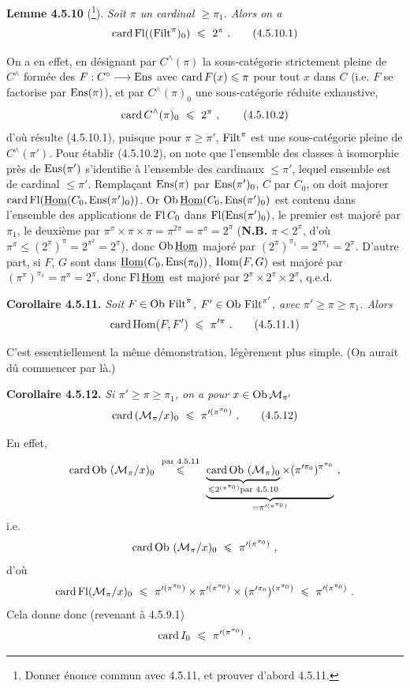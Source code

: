 \textbf{Lemme 4.5.10} (\footnote{Donner énonce commun avec 4.5.11, et prouver d'abord 4.5.11.}). \textit{Soit $\pi$ un cardinal $\geqslant \pi_1$. Alors on a} %
\[
\card \Fl((\Filt^\pi)_0) \ \leqslant \ 2^\pi \ . \tag*{(4.5.10.1)}
\]

On a en effet, en désignant par $C^\wedge(\pi)$ la sous-catégorie strictement pleine de $C^\wedge$ formée des $F : C^\circ \longrightarrow \mathrm{Ens}$ avec $\operatorname{card} F(x) \leqslant \pi$ pour tout $x$ dans $C$ (i.e. $F$ se factorise par $\mathrm{Ens}(\pi)$), et par $C^\wedge(\pi)_0$ une
sous-catégorie réduite exhaustive,
\[
\operatorname{card} C^\wedge(\pi)_0 \ \leqslant \ 2^\pi \ , \tag*{(4.5.10.2)}
\]
d'où résulte (4.5.10.1), puisque pour $\pi \geqslant \pi'$, $\operatorname{Filt}^\pi$ est une sous-catégorie pleine de $C^\wedge(\pi')$. Pour établir (4.5.10.2), on note que l'ensemble des classes à isomorphie près de $\mathrm{Ens}(\pi')$ s'identifie à l'ensemble des cardinaux $\leqslant \pi'$, lequel ensemble est de cardinal $\leqslant \pi'$. Remplaçant $\mathrm{Ens}(\pi)$ par $\mathrm{Ens}(\pi')_0$, $C$ par $C_0$, on doit majorer $\operatorname{card} \operatorname{Fl}(\underline{\mathrm{Hom}}(C_0, \mathrm{Ens}(\pi')_0))$. Or $\mathrm{Ob}\, \underline{\mathrm{Hom}}(C_0, \mathrm{Ens}(\pi')_0)$ est contenu dans l'ensemble des applications de $\operatorname{Fl} C_0$ dans $\operatorname{Fl}(\mathrm{Ens}(\pi')_0)$, le premier est majoré par $\pi_1$, le deuxième par $\pi^\pi \times \pi \times \pi = \pi^{2\pi} = \pi^\pi = 2^\pi$ (\textbf{N.B.} $\pi < 2^\pi$, d'où $\pi^\pi \leqslant (2^\pi)^\pi = 2^{\pi^2} = 2^\pi$), donc $\mathrm{Ob}\, \underline{\mathrm{Hom}}$ majoré par $(2^\pi)^{\pi_1} = 2^{\pi\pi_1} = 2^\pi$. D'autre part, si $F$, $G$ sont dans $\underline{\mathrm{Hom}}(C_0, \mathrm{Ens}(\pi_0))$, $\mathrm{Hom}(F,G)$ est majoré par $(\pi^\pi)^{\pi_1} = \pi^\pi = 2^\pi$, donc $\operatorname{Fl} \underline{\mathrm{Hom}}$ est majoré par $2^\pi \times 2^\pi \times 2^\pi$, q.e.d.

\textbf{Corollaire 4.5.11.} \textit{Soit $F \in \mathrm{Ob}\, \operatorname{Filt}^\pi$, $F' \in \mathrm{Ob}\, \operatorname{Filt}^{\pi'}$, avec $\pi' \geqslant \pi \geqslant \pi_1$. Alors}
\[
\card \Hom(F, F') \ \leqslant \ \pi'^{\pi} \ . \tag*{(4.5.11.1)}
\]


C'est essentiellement la même démonstration, légèrement plus simple. (On aurait dû commencer par là.)

\textbf{Corollaire 4.5.12.} \textit{Si $\pi' \geqslant \pi \geqslant \pi_1$, on a pour $x \in \mathrm{Ob}\, \mathcal{M}_{\pi'}$}
\[
\card\,(\mathcal{M}_\pi/x)_0 \ \leqslant \ \pi'^{(\pi^{\pi_0})} \ . \tag*{(4.5.12)}
\]

En effet,
\[
\card \Ob\,(\mathcal{M}_\pi/x)_0 \ \overset{\text{par 4.5.11}}{\leqslant} \ \underbrace{\underbrace{\card \Ob\,(\mathcal{M}_\pi)_0}_{\leqslant 2^{(\pi^{\pi_0})} \text{par 4.5.10}} \times (\pi'^{\pi_0})^{\pi^{\pi_0}}}_{= \pi'^{(\pi^{\pi_0})}} \ ,
\]
i.e.
\[
\card \Ob\,(\mathcal{M}_\pi/x)_0 \ \leqslant \ \pi'^{(\pi^{\pi_0})} \ ,
\]
d'où
\[
\card \Fl(\mathcal{M}_\pi/x)_0 \ \leqslant \ \pi'^{(\pi^{\pi_0})} \times \pi'^{(\pi^{\pi_0})} \times (\pi'^{\pi_0})^{(\pi^{\pi_0})} \ \leqslant \ \pi'^{(\pi^{\pi_0})} \ .
\]
Cela donne donc (revenant à 4.5.9.1)
\[
\card I_0 \ \leqslant \ \pi'^{(\pi^{\pi_0})} \ .
\]

